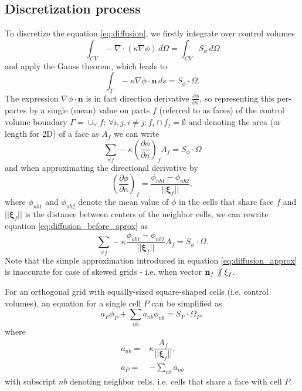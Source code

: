 \documentclass[]{article}
\begin{document}
\subsection{Discretization process}
To discretize the equation \ref{eq:diffusion}, we firstly integrate over control volumes
\begin{equation}
\int_{CV}^{}	-\nabla \cdot (\kappa\nabla\phi)\, d\Omega =\int_{CV}^{} S_\phi \, d\Omega
\end{equation}
and apply the Gauss theorem, which leads to
\begin{equation}
\int_{\Gamma}^{}	-\kappa\nabla\phi\cdot \mathbf{n}\, ds =  S_\phi \cdot \Omega.
\end{equation}
The expression $ \nabla\phi\cdot \mathbf{n} $ is in fact direction derivative $ \frac{\partial\phi}{\partial n} $, so representing  this per-partes by a single (mean) value on parts $ f $ (referred to as faces) of the control volume boundary $ \Gamma = \cup_\forall f; \, \forall i,j, i\neq j: f_i\cap f_j = \emptyset $ and denoting the area (or length for 2D) of a face as $ A_f $ we can write
\begin{equation}\label{eq:diffusion_before_aprox}
\sum_{\forall f} -\kappa  \left(\frac{\partial\phi}{\partial n}\right)_f A_f = S_\phi \cdot \Omega
\end{equation} 
and when approximating the directional derivative by 
\begin{equation}\label{eq:diffusion_approx}
\left(\frac{\partial\phi}{\partial n}\right)_f = \frac{\phi_{nb1}-\phi_{nb2}}{||\boldsymbol{\xi}_f||},
\end{equation}
where $ \phi_{nb1} $ and $ \phi_{nb2} $ denote the mean value of $ \phi $ in the cells that share face $ f $ and $ ||\boldsymbol{\xi}_f|| $ is the distance between centers of the neighbor cells, we can rewrite equation \ref{eq:diffusion_before_aprox} as
\begin{equation}\label{eq:diffusion_discrete}
\sum_{\forall f} -\kappa  \frac{\phi_{nb1}-\phi_{nb2}}{||\boldsymbol{\xi}_f||} A_f = S_\phi \cdot \Omega.
\end{equation}
Note that the simple approximation introduced in equation \ref{eq:diffusion_approx} is inaccurate for case of skewed grids - i.e. when vector $ \mathbf{n}_f \not\,\parallel \mathbf{\xi}_f$.

For an orthogonal grid with equally-sized square-shaped cells (i.e. control volumes), an equation for a single cell $ P $ can be simplified as
\begin{equation}\label{eq:diffusion_one_cell}
a_P\phi_P + \sum_{nb} a_{nb} \phi_{nb} = S_P\cdot \Omega_P,
\end{equation}
where
\begin{align}
	a_{nb} =& \kappa \dfrac{A_f}{||\boldsymbol{\xi}_f||},\\
	a_P =& - \sum_{nb} a_{nb}
\end{align}
with subscript $ nb $ denoting neighbor cells, i.e. cells that share a face with cell $ P $.
\end{document}
